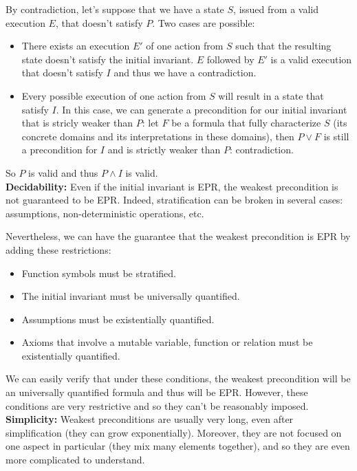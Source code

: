 \documentclass[11pt,a4paper,oldfontcommands]{memoir}
\begin{document}
    By contradiction, let's suppose that we have a state \(S\), issued from a valid execution \(E\), that doesn't satisfy \(P\).
    Two cases are possible:
    \begin{itemize}
        \item There exists an execution \(E'\) of one action from \(S\) such that the resulting state doesn't satisfy the initial invariant.
        \(E\) followed by \(E'\) is a valid execution that doesn't satisfy \(I\) and thus we have a contradiction.
        \item Every possible execution of one action from \(S\) will result in a state that satisfy \(I\).
        In this case, we can generate a precondition for our initial invariant that is stricly weaker than \(P\):
        let \(F\) be a formula that fully characterize \(S\) (its concrete domains and its interpretations in these domains),
        then \(P \lor F\) is still a precondition for \(I\) and is strictly weaker than \(P\): contradiction. 
    \end{itemize}

    So \(P\) is valid and thus \(P \land I\) is valid.\\

    \textbf{Decidability:} Even if the initial invariant is EPR, the weakest precondition is not guaranteed to be EPR.
    Indeed, stratification can be broken in several cases: assumptions, non-deterministic operations, etc.

    Nevertheless, we can have the guarantee that the weakest precondition is EPR by adding these restrictions:
    \begin{itemize}
        \item Function symbols must be stratified.
        \item The initial invariant must be universally quantified.
        \item Assumptions must be existentially quantified.
        \item Axioms that involve a mutable variable, function or relation must be existentially quantified.
    \end{itemize}
    We can easily verify that under these conditions, the weakest precondition will be an universally quantified formula
    and thus will be EPR. However, these conditions are very restrictive and so they can't be reasonably imposed.
    \\

    \textbf{Simplicity:} Weakest preconditions are usually very long, even after simplification (they can grow exponentially).
    Moreover, they are not focused on one aspect in particular (they mix many elements together), and so they are even more complicated
    to understand.
\end{document}
